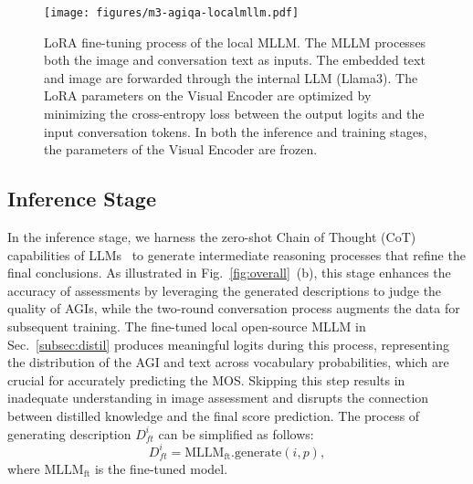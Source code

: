\begin{figure}
    \centering
    \texttt{[image: figures/m3-agiqa-localmllm.pdf]}
    \caption{LoRA fine-tuning process of the local MLLM. The MLLM processes both the image and conversation text as inputs. The embedded text and image are forwarded through the internal LLM (Llama3). The LoRA parameters on the Visual Encoder are optimized by minimizing the cross-entropy loss between the output logits and the input conversation tokens. In both the inference and training stages, the parameters of the Visual Encoder are frozen.}
    \label{fig:localmllm}
\end{figure}

\subsection{Inference Stage} \label{subsec:inference}
In the inference stage, we harness the zero-shot Chain of Thought (CoT) capabilities of LLMs~\cite{kojima2022large} to generate intermediate reasoning processes that refine the final conclusions.
As illustrated in Fig.~\ref{fig:overall}~(b), this stage enhances the accuracy of assessments by leveraging the generated descriptions to judge the quality of AGIs, while the two-round conversation process augments the data for subsequent training.
The fine-tuned local open-source MLLM in Sec.~\ref{subsec:distil} produces meaningful logits during this process, representing the distribution of the AGI and text across vocabulary probabilities, which are crucial for accurately predicting the MOS.
Skipping this step results in inadequate understanding in image assessment and disrupts the connection between distilled knowledge and the final score prediction.
The process of generating description $D^i_{ft}$ can be simplified as follows:
\begin{equation}
    D^i_{ft} = \textrm{MLLM}_\textrm{ft}.\textrm{generate}\left(i, p\right),
\end{equation}
where $\textrm{MLLM}_\textrm{ft}$ is the fine-tuned model.

